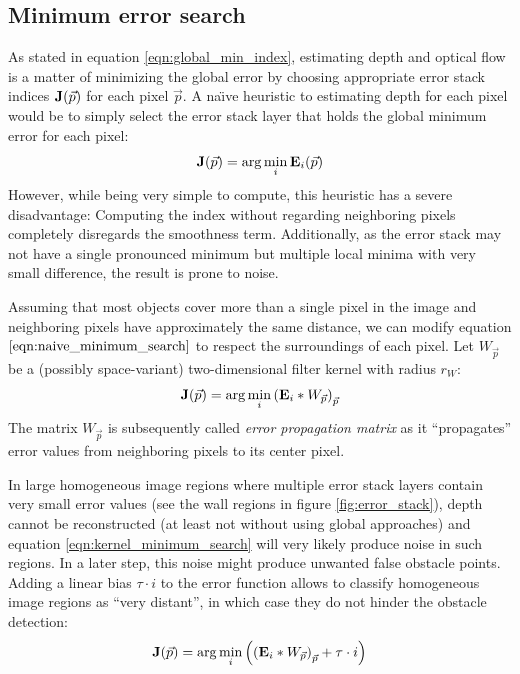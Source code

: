 \subsection{Minimum error search}

\label{sec:minimum_error_search}
As stated in equation \ref{eqn:global_min_index}, estimating depth and optical flow is a matter of minimizing the global error by choosing appropriate error stack indices $\img{J}(\vec p)$ for each pixel $\vec p$. A na\"{\i}ve heuristic to estimating depth for each pixel would be to simply select the error stack layer that holds the global minimum error for each pixel:
\begin{equation}
	\img{J}(\vec p) = \arg \min_{i} \img{E}_i(\vec p) \label{eqn:naive_minimum_search}
\end{equation}
However, while being very simple to compute, this heuristic has a severe disadvantage: Computing the index without regarding neighboring pixels completely disregards the smoothness term. Additionally, as the error stack may not have a single pronounced minimum but multiple local minima with very small difference, the result is prone to noise.

Assuming that most objects cover more than a single pixel in the image and neighboring pixels have approximately the same distance, we can modify equation $\ref{eqn:naive_minimum_search}$ to respect the surroundings of each pixel. Let $W_{\vec p}$ be a (possibly space-variant) two-dimensional filter kernel with radius $r_W$:
\begin{equation}
	\img{J}(\vec p) = \arg \min_{i} \left( \img{E}_i \ast W_{\vec p} \right)_{\vec p} \label{eqn:kernel_minimum_search}
\end{equation}
The matrix $W_{\vec p}$ is subsequently called \textit{error propagation matrix} as it ``propagates'' error values from neighboring pixels to its center pixel.

In large homogeneous image regions where multiple error stack layers contain very small error values (see the wall regions in figure \ref{fig:error_stack}), depth cannot be reconstructed (at least not without using global approaches) and equation \ref{eqn:kernel_minimum_search} will very likely produce noise in such regions. In a later step, this noise might produce unwanted false obstacle points. Adding a linear bias $\tau \cdot i$ to the error function allows to classify homogeneous image regions  as ``very distant'', in which case they do not hinder the obstacle detection:
\begin{equation}
	\img{J}(\vec p) = \arg \min_{i} \left( \left( \img{E}_i \ast W_{\vec p} \right)_{\vec p} + \tau \cdot i \right) \label{eqn:kernel_minimum_search_bias}
\end{equation}

